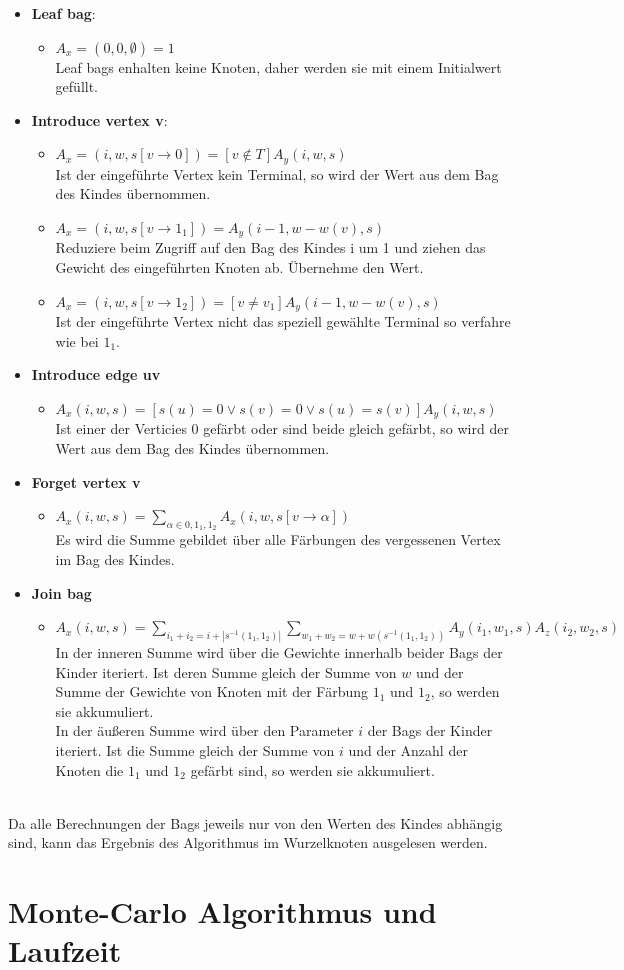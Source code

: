 \begin{itemize}
\item \textbf{Leaf bag}:
\begin{itemize}
\item $A_x=(0,0,\emptyset) = 1$\\Leaf bags enhalten keine Knoten, daher werden sie mit einem Initialwert gefüllt.
\end{itemize}
\item \textbf{Introduce vertex v}:
\begin{itemize}
\item $A_x=(i,w,s[v\rightarrow 0]) = [v \notin T]A_y(i,w,s)$\\ Ist der eingeführte Vertex kein Terminal, so wird der Wert aus dem Bag des Kindes übernommen.
\item $A_x=(i,w,s[v\rightarrow 1_1]) = A_y(i-1,w-w(v),s)$\\ Reduziere beim Zugriff auf den Bag des Kindes i um 1 und ziehen das Gewicht des eingeführten Knoten ab. Übernehme den Wert.
\item $A_x=(i,w,s[v\rightarrow 1_2]) =[v \neq v_1] A_y(i-1,w-w(v),s)$\\ Ist der eingeführte Vertex nicht das speziell gewählte Terminal so verfahre wie bei $1_1$.
\end{itemize}
\item \textbf{Introduce edge uv}
\begin{itemize}
\item $A_x(i,w,s) = [s(u) = 0 \vee s(v) = 0 \vee s(u) = s(v)]A_y(i,w,s)$\\ Ist einer der Verticies $0$ gefärbt oder sind beide gleich gefärbt, so wird der Wert aus dem Bag des Kindes übernommen.
\end{itemize}
\item \textbf{Forget vertex v}
\begin{itemize}
\item $A_x(i,w,s) = \sum\limits_{\alpha \in {0,1_1,1_2}} A_x(i,w,s[v \rightarrow \alpha]) $\\ Es wird die Summe gebildet über alle Färbungen des vergessenen Vertex im Bag des Kindes.
\end{itemize}
\item \textbf{Join bag}
\begin{itemize}
\item $A_x(i,w,s) = \sum\limits_{i_1+i_2=i+|s^{-1}({1_1,1_2})|} \sum\limits_{w_1+w_2=w+w(s^{-1}({1_1,1_2}))} A_y(i_1,w_1,s)A_z(i_2,w_2,s) $\\In der inneren Summe wird über die Gewichte innerhalb beider Bags der Kinder iteriert. Ist deren Summe gleich der Summe von $w$ und der Summe der Gewichte von Knoten mit der Färbung $1_1$ und $1_2$, so werden sie akkumuliert.
\\In der äußeren Summe wird über den Parameter $i$ der Bags der Kinder iteriert. Ist die Summe gleich der Summe von $i$ und der Anzahl der Knoten die $1_1$ und $1_2$ gefärbt sind, so werden sie akkumuliert.
\end{itemize}
\end{itemize}\\
Da alle Berechnungen der Bags jeweils nur von den Werten des Kindes abhängig sind, kann das Ergebnis des Algorithmus im Wurzelknoten ausgelesen werden. 

\section{Monte-Carlo Algorithmus und Laufzeit}
\label{sec:mc_alg}
